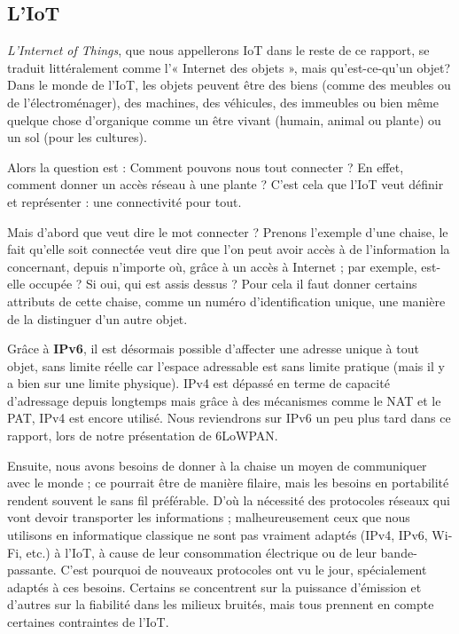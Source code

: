 
\subsection{L'IoT}

\textit{L'Internet of Things}, que nous appellerons IoT dans le reste de ce rapport, se traduit littéralement comme l'« Internet des objets », mais qu'est-ce-qu'un objet? Dans le monde de l'IoT, les objets peuvent être des biens (comme des meubles ou de l'électroménager), des machines, des véhicules, des immeubles ou bien même quelque chose d'organique comme un être vivant (humain, animal ou plante) ou un sol (pour les cultures).

Alors la question est : Comment pouvons nous tout connecter ? En effet, comment donner un accès réseau à une plante ? C'est cela que l'IoT veut définir et représenter : une connectivité pour tout.

Mais d'abord que veut dire le mot connecter ? Prenons l'exemple d'une chaise, le fait qu'elle soit connectée veut dire que l’on peut avoir accès à de l'information la concernant, depuis n'importe où, grâce à un accès à Internet ; par exemple, est-elle occupée ? Si oui, qui est assis dessus ? Pour cela il faut donner certains attributs de cette chaise, comme un numéro d'identification unique, une manière de la distinguer d'un autre objet. 

Grâce à \textbf{IPv6}, il est désormais possible d’affecter une adresse unique à tout objet, sans limite réelle car l'espace adressable est sans limite pratique (mais il y a bien sur une limite physique). IPv4 est dépassé en terme de capacité d'adressage depuis longtemps mais grâce à des mécanismes comme le NAT et le PAT, IPv4 est encore utilisé. Nous reviendrons sur IPv6 un peu plus tard dans ce rapport, lors de notre présentation de 6LoWPAN.

Ensuite, nous avons besoins de donner à la chaise un moyen de communiquer avec le monde ; ce pourrait être de manière filaire, mais les besoins en portabilité rendent souvent le sans fil préférable. D'où la nécessité des protocoles réseaux qui vont devoir transporter les informations ; malheureusement ceux que nous utilisons en informatique classique ne sont pas vraiment adaptés (IPv4, IPv6, Wi-Fi, etc.) à l'IoT, à cause de leur consommation électrique ou de leur bande-passante. C'est pourquoi de nouveaux protocoles ont vu le jour, spécialement adaptés à ces besoins. Certains se concentrent sur la puissance d'émission et d'autres sur la fiabilité dans les milieux bruités, mais tous prennent en compte certaines contraintes de l'IoT.

